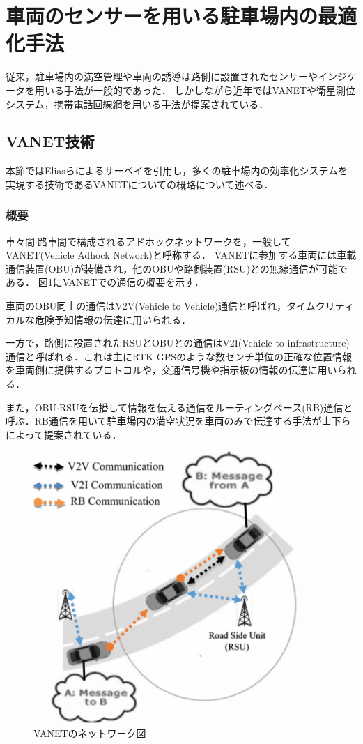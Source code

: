 \section{車両のセンサーを用いる駐車場内の最適化手法}
従来，駐車場内の満空管理や車両の誘導は路側に設置されたセンサーやインジケータを用いる手法が一般的であった．
しかしながら近年ではVANETや衛星測位システム，携帯電話回線網を用いる手法が提案されている．


\subsection{VANET技術}
本節ではEliasらによるサーベイ\cite{Elias}を引用し，多くの駐車場内の効率化システムを実現する技術であるVANETについての概略について述べる．




\subsubsection{概要}
車々間$\cdot$路車間で構成されるアドホックネットワークを，一般してVANET(Vehicle Adhock Network)と呼称する．
VANETに参加する車両には車載通信装置(OBU)が装備され，他のOBUや路側装置(RSU)との無線通信が可能である．
図\ref{vanet}にVANETでの通信の概要を示す．


車両のOBU同士の通信はV2V(Vehicle to Vehicle)通信と呼ばれ，タイムクリティカルな危険予知情報の伝達に用いられる．

一方で，路側に設置されたRSUとOBUとの通信はV2I(Vehicle to infrastructure)通信と呼ばれる．これは主にRTK-GPS\cite{RTK}のような数センチ単位の正確な位置情報を車両側に提供するプロトコルや，交通信号機や指示板の情報の伝達に用いられる．

また，OBU$\cdot$RSUを伝播して情報を伝える通信をルーティングベース(RB)通信と呼ぶ．RB通信を用いて駐車場内の満空状況を車両のみで伝達する手法が山下らによって提案されている\cite{Yamashita}．




\begin{figure}
	\centering
	\includegraphics[width=10cm]{fig/vanet.png}
	\caption{VANETのネットワーク図 \protect \footnotemark}
	\label{vanet}
\end{figure}


